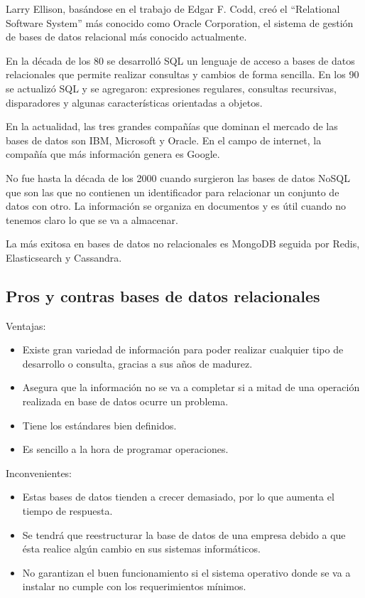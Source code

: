 \documentclass[12pt]{report} %
\begin{document}
	Larry Ellison, basándose en el trabajo de Edgar F. Codd, creó el “Relational Software System” más conocido como Oracle Corporation, el sistema de gestión de bases de datos relacional más conocido actualmente.
	
	En la década de los 80 se desarrolló SQL un lenguaje de acceso a bases de datos relacionales que permite realizar consultas y cambios de forma sencilla. En los 90 se actualizó SQL y se agregaron: expresiones regulares, consultas recursivas, disparadores y algunas características orientadas a objetos.
	
	En la actualidad, las tres grandes compañías que dominan el mercado de las bases de datos son IBM, Microsoft y Oracle. En el campo de internet, la compañía que más información genera es Google.
	
	No fue hasta la década de los 2000 cuando surgieron las bases de datos NoSQL que son las que no contienen un identificador para relacionar un conjunto de datos con otro. La información se organiza en documentos y es útil cuando no tenemos claro lo que se va a almacenar.
	
	La más exitosa en bases de datos no relacionales es MongoDB seguida por Redis, Elasticsearch y Cassandra.
	
	\subsection{Pros y contras bases de datos relacionales}
	Ventajas:
	 \begin{itemize}
		\item Existe gran variedad de información para poder realizar cualquier tipo de desarrollo o consulta, gracias a sus años de madurez.
		\item Asegura que la información no se va a completar si a mitad de una operación realizada en base de datos ocurre un problema.
		\item Tiene los estándares bien definidos.
		\item Es sencillo a la hora de programar operaciones.
	\end{itemize}
	Inconvenientes:
		 \begin{itemize}
		\item Estas bases de datos tienden a crecer demasiado, por lo que aumenta el tiempo de respuesta.
		\item Se tendrá que reestructurar la base de datos de una empresa debido a que ésta realice algún cambio en sus sistemas informáticos.
		\item No garantizan el buen funcionamiento si el sistema operativo donde se va a instalar no cumple con los requerimientos mínimos.
	\end{itemize}
\end{document}
